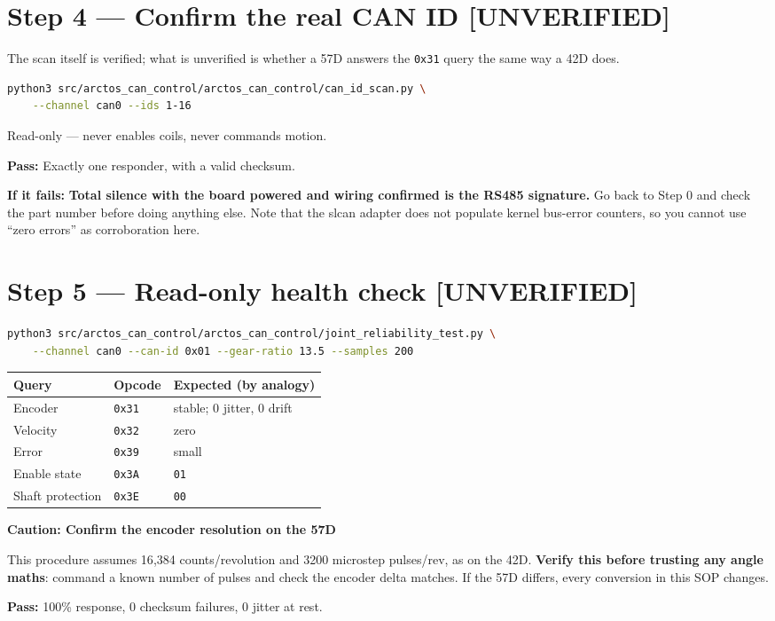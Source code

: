 \documentclass[11pt,letterpaper]{article}
\newenvironment{caution}[1]{%
    \par\addvspace{8pt}%
    \noindent{\color{cautionred}\rule{\linewidth}{0.8pt}}\par\vspace{2pt}
    \noindent\textbf{\color{cautionred}Caution: #1}\par\vspace{2pt}
}{%
    \par\vspace{2pt}\noindent{\color{cautionred}\rule{\linewidth}{0.4pt}}%
    \par\addvspace{8pt}%
}
\newcommand{\unverified}{{\color{unverifiedorange}\textbf{[UNVERIFIED]}}}
\newcommand{\passif}[1]{\par\vspace{2pt}\noindent\textbf{\color{okgreen}Pass:} #1\par\vspace{4pt}}
\newcommand{\failif}[1]{\noindent\textbf{If it fails:} #1\par\vspace{6pt}}
\begin{document}
\section*{Step 4 --- Confirm the real CAN ID \unverified}
The scan itself is verified; what is unverified is whether a 57D answers the
\texttt{0x31} query the same way a 42D does.
\begin{lstlisting}[language=bash]
python3 src/arctos_can_control/arctos_can_control/can_id_scan.py \
    --channel can0 --ids 1-16
\end{lstlisting}
Read-only --- never enables coils, never commands motion.
\passif{Exactly one responder, with a valid checksum.}
\failif{\textbf{Total silence with the board powered and wiring confirmed is the
RS485 signature.} Go back to Step 0 and check the part number before doing anything
else. Note that the slcan adapter does not populate kernel bus-error counters, so
you cannot use ``zero errors'' as corroboration here.}

\section*{Step 5 --- Read-only health check \unverified}
\begin{lstlisting}[language=bash]
python3 src/arctos_can_control/arctos_can_control/joint_reliability_test.py \
    --channel can0 --can-id 0x01 --gear-ratio 13.5 --samples 200
\end{lstlisting}

\begin{table}[h]
\centering
\begin{tabular}{lll}
\toprule
\textbf{Query} & \textbf{Opcode} & \textbf{Expected (by analogy)} \\ \midrule
Encoder          & \texttt{0x31} & stable; 0 jitter, 0 drift \\
Velocity         & \texttt{0x32} & zero \\
Error            & \texttt{0x39} & small \\
Enable state     & \texttt{0x3A} & \texttt{01} \\
Shaft protection & \texttt{0x3E} & \texttt{00} \\
\bottomrule
\end{tabular}
\end{table}

\begin{caution}{Confirm the encoder resolution on the 57D}
This procedure assumes 16{,}384 counts/revolution and 3200 microstep pulses/rev, as
on the 42D. \textbf{Verify this before trusting any angle maths}: command a known
number of pulses and check the encoder delta matches. If the 57D differs, every
conversion in this SOP changes.
\end{caution}
\passif{100\% response, 0 checksum failures, 0 jitter at rest.}
\end{document}
